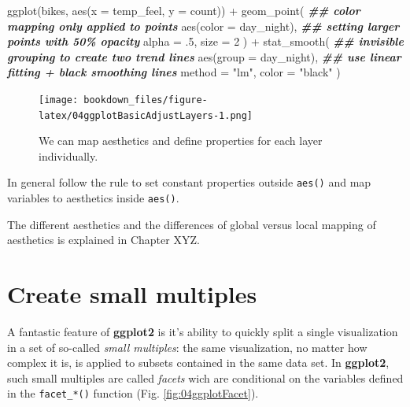 \documentclass[
]{krantz}
\makeatletter
\newenvironment{Shaded}{\begin{snugshade}}{\end{snugshade}}
\newcommand{\AttributeTok}[1]{\textcolor[rgb]{0.61,0.61,0.61}{#1}}
\newcommand{\DecValTok}[1]{\textcolor[rgb]{0.06,0.06,0.06}{#1}}
\newcommand{\DocumentationTok}[1]{\textcolor[rgb]{0.37,0.37,0.37}{\textbf{\textit{#1}}}}
\newcommand{\FunctionTok}[1]{\textcolor[rgb]{0,0,0}{#1}}
\newcommand{\NormalTok}[1]{#1}
\newcommand{\SpecialCharTok}[1]{\textcolor[rgb]{0,0,0}{#1}}
\newcommand{\StringTok}[1]{\textcolor[rgb]{0.5,0.5,0.5}{#1}}
\newenvironment{kframe}{%
\medskip{}
\setlength{\fboxsep}{.8em}
 \def\at@end@of@kframe{}%
 \ifinner\ifhmode%
  \def\at@end@of@kframe{\end{minipage}}%
  \begin{minipage}{\columnwidth}%
 \fi\fi%
 \def\FrameCommand##1{\hskip\@totalleftmargin \hskip-\fboxsep
 \colorbox{shadecolor}{##1}\hskip-\fboxsep
     \hskip-\linewidth \hskip-\@totalleftmargin \hskip\columnwidth}%
 \MakeFramed {\advance\hsize-\width
   \@totalleftmargin\z@ \linewidth\hsize
   \@setminipage}}%
 {\par\unskip\endMakeFramed%
 \at@end@of@kframe}
\renewenvironment{Shaded}{\begin{kframe}}{\end{kframe}}
\makeatother
\begin{document}
\begin{Shaded}
\begin{Highlighting}[]
\FunctionTok{ggplot}\NormalTok{(bikes, }\FunctionTok{aes}\NormalTok{(}\AttributeTok{x =}\NormalTok{ temp\_feel, }\AttributeTok{y =}\NormalTok{ count)) }\SpecialCharTok{+} 
  \FunctionTok{geom\_point}\NormalTok{(}
    \DocumentationTok{\#\# color mapping only applied to points}
    \FunctionTok{aes}\NormalTok{(}\AttributeTok{color =}\NormalTok{ day\_night), }
    \DocumentationTok{\#\# setting larger points with 50\% opacity}
    \AttributeTok{alpha =}\NormalTok{ .}\DecValTok{5}\NormalTok{, }\AttributeTok{size =} \DecValTok{2}
\NormalTok{  ) }\SpecialCharTok{+} 
  \FunctionTok{stat\_smooth}\NormalTok{(}
    \DocumentationTok{\#\# invisible grouping to create two trend lines}
    \FunctionTok{aes}\NormalTok{(}\AttributeTok{group =}\NormalTok{ day\_night), }
    \DocumentationTok{\#\# use linear fitting + black smoothing lines}
    \AttributeTok{method =} \StringTok{"lm"}\NormalTok{, }\AttributeTok{color =} \StringTok{"black"}
\NormalTok{  )}
\end{Highlighting}
\end{Shaded}

\begin{figure}
\centering
\texttt{[image: bookdown\_files/figure-latex/04ggplotBasicAdjustLayers-1.png]}
\caption{\label{fig:04ggplotBasicAdjustLayers}We can map aesthetics and define properties for each layer individually.}
\end{figure}

In general follow the rule to set constant properties outside \texttt{aes()} and map variables to aesthetics inside \texttt{aes()}.

The different aesthetics and the differences of global versus local mapping of aesthetics is explained in Chapter XYZ.

\hypertarget{faceting}{%
\section{Create small multiples}\label{faceting}}

A fantastic feature of \textbf{ggplot2} is it's ability to quickly split a single visualization in a set of so-called \emph{small multiples}: the same visualization, no matter how complex it is, is applied to subsets contained in the same data set. In \textbf{ggplot2}, such small multiples are called \emph{facets} wich are conditional on the variables defined in the \texttt{facet\_*()} function (Fig. \ref{fig:04ggplotFacet}).
\end{document}

